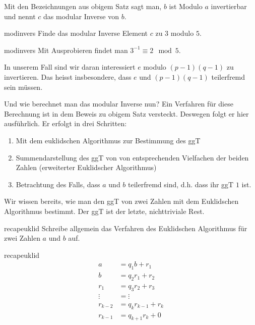 \documentclass[%
<<<<<<< Updated upstream
11pt,%
twoside,%
titlepage,%
german,%
headsepline%
]{scrartcl}
\begin{document}
\begin{cdef}
Mit den Bezeichnungen aus obigem Satz sagt man, $b$ ist Modulo $a$ invertierbar und nennt $c$ das modular Inverse von $b$.
\end{cdef}

\begin{uebenv}{modinvers}
Finde das modular Inverse Element $c$ zu $3$ modulo $5$.
\end{uebenv}

\begin{lsg}{modinvers}
    Mit Ausprobieren findet man $3^{-1}\equiv2\mod5$.
\end{lsg}

In unserem Fall sind wir daran interessiert $e$ modulo $(p-1)(q-1)$ zu invertieren. Das heisst insbesondere, dass $e$ und $(p-1)(q-1)$ teilerfremd sein müssen.

Und wie berechnet man das modular Inverse nun? Ein Verfahren für diese Berechnung ist in dem Beweis zu obigem Satz versteckt. Deswegen folgt er hier ausführlich. Er erfolgt in drei Schritten:

\begin{enumerate}
\item Mit dem euklidschen Algorithmus zur Bestimmung des ggT
\item Summendarstellung des ggT von von entsprechenden Vielfachen der beiden Zahlen (erweiterter Euklidscher Algorithmus)
\item Betrachtung des Falls, dass $a$ und $b$ teilerfremd sind, d.h. dass ihr ggT $1$ ist.
\end{enumerate}

Wir wissen bereits, wie man den ggT von zwei Zahlen mit dem Euklidschen Algorithmus bestimmt. Der ggT ist der letzte, nichttriviale Rest.

\begin{uebenv}{recapeuklid}
Schreibe allgemein das Verfahren des Euklidschen Algorithmus für zwei Zahlen $a$ und $b$ auf.
\end{uebenv}

\begin{lsg}{recapeuklid}
    \begin{align*}
        a &= q_1b+r_1\\
        b &= q_2r_1+r_2\\
        r_1 &= q_3r_2+r_3\\
        \vdots &= \vdots\\
        r_{k-2} &= q_{k}r_{k-1}+r_{k}\\
        r_{k-1} &= q_{k+1}r_{k}+0
    \end{align*}
\end{lsg}
\end{document}
